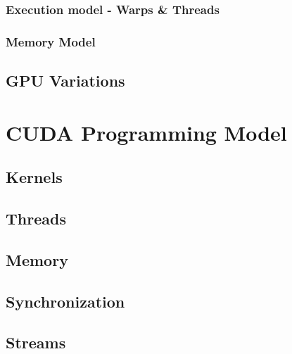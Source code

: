 \documentclass[12px,oz]{report}
\theoremstyle{indented}
\theoremstyle{indented}
\def \cuda {CUDA}
\begin{document}
		\subsection{Execution model - Warps \& Threads}
		\label{sec-hw-warps-threads}
		

		\subsection{Memory Model}
		\label{sec-hw-memory-model}
		

	\section{GPU Variations}
	\label{sec-hw-variations}
	


\chapter{\cuda{} Programming Model}
\label{ch-programming-model}


	\section{Kernels}
	\label{sec-pm-kernels}
	

	\section{Threads}
	\label{sec-pm-threads}
	
	
	\section{Memory}
	\label{sec-pm-memory}
	
	
	\section{Synchronization}
	\label{sec-pm-synch}
	
	
	\section{Streams}
	\label{sec-pm-streams}
		
	
\end{document}
